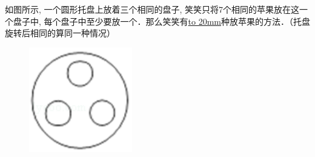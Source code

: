 \item {
    如图所示, 一个圆形托盘上放着三个相同的盘子, 笑笑只将7个相同的苹果放在这一个盘子中, 每个盘子中至少要放一个．那么笑笑有\underline{\hbox to 20mm{}}种放苹果的方法．（托盘旋转后相同的算同一种情况）
    \begin{figure}[H] 
        \centering
        \includegraphics[width=0.4\textwidth]{./pics/Chapter_6/2015_4.png}
    \end{figure}
}





